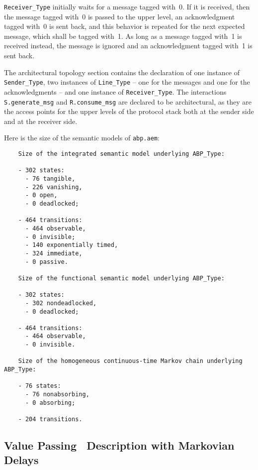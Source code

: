 {\tt Receiver\_Type} initially waits for a message tagged with~0. If it is received, then the message tagged
with~0 is passed to the upper level, an acknowledgment tagged with~0 is sent back, and this behavior is
repeated for the next expected message, which shall be tagged with~1. As long as a message tagged with~1 is
received instead, the message is ignored and an acknowledgment tagged with~1 is sent back.

The architectural topology section contains the declaration of one instance of {\tt Sender\_Type}, two
instances of {\tt Line\_Type} -- one for the messages and one for the acknowledgments -- and one instance of
{\tt Receiver\_Type}. The interactions {\tt S.generate\_msg} and {\tt R.consume\_msg} are declared to be
architectural, as they are the access points for the upper levels of the protocol stack both at the sender
side and at the receiver side.

Here is the size of the semantic models of {\tt abp.aem}:

	\begin{verbatim}
    Size of the integrated semantic model underlying ABP_Type:

    - 302 states: 
      - 76 tangible, 
      - 226 vanishing, 
      - 0 open, 
      - 0 deadlocked;

    - 464 transitions:
      - 464 observable,
      - 0 invisible;
      - 140 exponentially timed,
      - 324 immediate,
      - 0 passive.

    Size of the functional semantic model underlying ABP_Type:

    - 302 states: 
      - 302 nondeadlocked, 
      - 0 deadlocked;

    - 464 transitions:
      - 464 observable,
      - 0 invisible.

    Size of the homogeneous continuous-time Markov chain underlying ABP_Type:

    - 76 states: 
      - 76 nonabsorbing, 
      - 0 absorbing;

    - 204 transitions.
	\end{verbatim}


\subsection{Value Passing \aemilia\ Description with Markovian Delays}\label{abp_vp}

